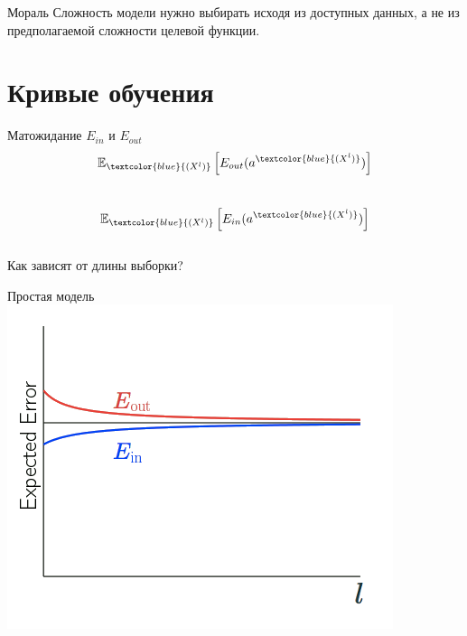 \documentclass[10pt]{beamer}
\newcommand{\xblue}{\textcolor{blue}{(X^l)}}
\begin{document}
\begin{frame}{Мораль}
  Сложность модели нужно выбирать исходя из доступных данных, а не из предполагаемой сложности целевой функции.
\end{frame}
%
%

\section{Кривые обучения}

\begin{frame}{Матожидание $E_{in}$ и $E_{out}$}
  $$\mathbb{E}_{\xblue} \left[ E_{out}(a^{\xblue}) \right] $$\\
  \bigbreak \pause
  $$\mathbb{E}_{\xblue} \left[ E_{in}(a^{\xblue}) \right] $$\\
  \bigbreak \pause
  Как зависят от длины выборки?
\end{frame}

\begin{frame}{Простая модель}
  \centering
  \includegraphics[width=0.8 \textwidth, keepaspectratio]{images/simple_model}
\end{frame}
\end{document}
